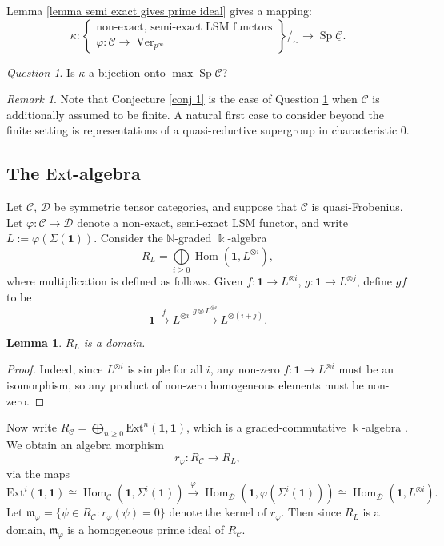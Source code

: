 \documentclass[11pt]{amsart}
\def\Hom{\operatorname{Hom}}
\def\N{\mathbb{N}}
\def\Cs{\mathcal{C}}
\def\Cs{\mathscr{C}}
\def\Ds{\mathscr{D}}
\def\m{\mathfrak{m}}
\def\Ver{\operatorname{Ver}}
\def\Ext{\text{Ext}}
\def\ul{\underline}
\def\Sp{\operatorname{Sp}}
\def\xto{\xrightarrow}
\newtheorem{lemma}[thm]{Lemma}
\theoremstyle{definition}
\theoremstyle{remark}
\newtheorem{remark}[thm]{Remark}
\newtheorem{question}[thm]{Question}
\numberwithin{equation}{section}
\begin{document}
Lemma \ref{lemma semi exact gives prime ideal} gives a mapping:
\[
\kappa:\left\{
\begin{array}{c}
    \text{non-exact, semi-exact LSM functors}  \\
      \varphi:\Cs\to\Ver_{p^\infty}
\end{array}
\right\}/_\sim \longrightarrow\Sp\ul{\Cs}.
\]
\begin{question}\label{question}
    Is $\kappa$ a bijection onto $\max\Sp\ul{\Cs}$?
\end{question}

\begin{remark}
    Note that Conjecture \ref{conj 1} is the case of Question \ref{question} when $\Cs$ is additionally assumed to be finite.  A natural first case to consider beyond the finite setting is representations of a quasi-reductive supergroup in characteristic 0.
\end{remark}


\subsection{The $\Ext$-algebra}
Let $\Cs$, $\Ds$ be symmetric tensor categories, and suppose that $\Cs$ is quasi-Frobenius.  Let $\varphi:\Cs\to\Ds$ denote a non-exact, semi-exact LSM functor, and write $L:=\varphi(\Sigma(\mathbf{1}))$.  Consider the $\N$-graded $\Bbbk$-algebra 
\[
R_{L}=\bigoplus\limits_{i\geq 0}\Hom(\mathbf{1},L^{\otimes i}),
\] 
where multiplication is defined as follows.  Given $f:\mathbf{1}\to L^{\otimes i}$, $g:\mathbf{1}\to L^{\otimes j}$, define $gf$ to be 
\[
\mathbf{1}\xto{f}L^{\otimes i}\xto{g\otimes L^{\otimes i}}L^{\otimes (i+j)}.
\]
\begin{lemma}
    $R_{L}$ is a domain.
\end{lemma}
\begin{proof}
    Indeed, since $L^{\otimes i}$ is simple for all $i$, any non-zero $f:\mathbf{1}\to L^{\otimes i}$ must be an isomorphism, so any product of non-zero homogeneous elements must be non-zero. 
\end{proof}

Now write $R_{\Cs}=\bigoplus\limits_{n\geq 0}\Ext^n(\mathbf{1},\mathbf{1})$, which is a graded-commutative $\Bbbk$-algebra \cite[Prop.~3.3]{Bal}.  We obtain an algebra morphism
\[
r_{\varphi}:R_{\Cs}\to R_L,
\]
via the maps
\[
\Ext^i(\mathbf{1},\mathbf{1})\cong \Hom_{\ul{\Cs}}(\mathbf{1},\Sigma^i(\mathbf{1}))\xto{\varphi}\Hom_{\Ds}(\mathbf{1},\varphi(\Sigma^i(\mathbf{1})))\cong\Hom_{\Ds}(\mathbf{1},L^{\otimes i}).
\]
Let $\m_{\varphi}=\{\psi\in R_{\Cs}:r_{\varphi}(\psi)=0\}$ denote the kernel of $r_\varphi$.  Then since $R_{L}$ is a domain, $\m_{\varphi}$ is a homogeneous prime ideal of $R_{\Cs}$.
\end{document}

